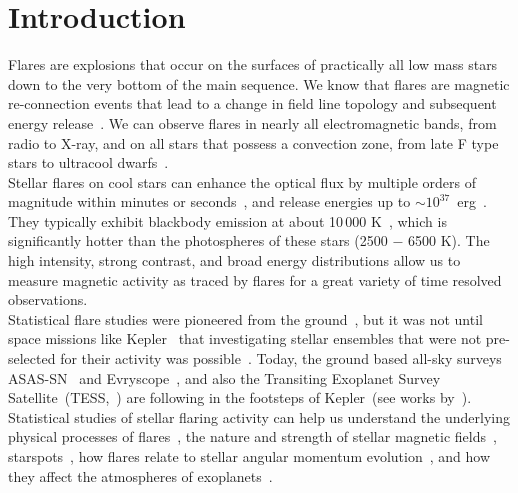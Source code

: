 \documentclass{aa}
\begin{document}
\section{Introduction}
Flares are explosions that occur on the surfaces of practically all low mass stars down to the very bottom of the main sequence. We know that flares are magnetic re-connection events that lead to a change in field line topology and subsequent energy release~\citep{priest_magnetic_2002}. We can observe flares in nearly all electromagnetic bands, from radio
to X-ray, and on all stars that possess a convection zone, from late F type stars to ultracool dwarfs~\citep{schaefer2000,benz2010,gizis2013}. 
\\
Stellar flares on cool stars can enhance the optical flux by multiple orders of magnitude within minutes or seconds~\citep{haisch1991, schmidt2019}, and release energies up to \mbox{$\sim10^{37}$ erg}~\citep{maehara2012, davenport_kepler_2016}. They typically exhibit blackbody emission at about 10\,000 K~\citep{hawley1992, kowalski2013}, which is significantly hotter than the photospheres of these stars (2500 $-$ 6500 K). The high intensity, strong contrast, and broad energy distributions allow us to measure magnetic activity as traced by flares for a great variety of time resolved observations.
\\
Statistical flare studies were pioneered from the ground~\citep{lacy_uv_1976}, but it was not until space missions like Kepler~\citep{koch2010} that investigating stellar ensembles that were not pre-selected for their activity was possible~\citep{walkowicz2011}. Today, the ground based all-sky surveys ASAS-SN~\citep{shappee2014} and Evryscope~\citep{law2015}, and also the Transiting Exoplanet Survey Satellite~(TESS,~\citealt{ricker2014}) are following in the footsteps of Kepler~(see works by~\citealt{schmidt2019,rodriguez2020,howard2019, howard2020, guenther2020, feinstein2020}). Statistical studies of stellar flaring activity can help us understand the underlying physical processes of flares~\citep{benz2010}, the nature and strength of stellar magnetic fields~\citep{berger2006, odert2017}, starspots~\citep{davenport_flaresandspots_2015, notsu2019, howard2020}, how flares relate to stellar angular momentum evolution~\citep{mondrik2019, howard2020}, and how they affect the atmospheres of exoplanets~\citep{lecavelier_flareescape_2012, loyd_mflaresplanetsfuv_2018, tilley_repeated_flare_2019, howard2019}.%
\end{document}
